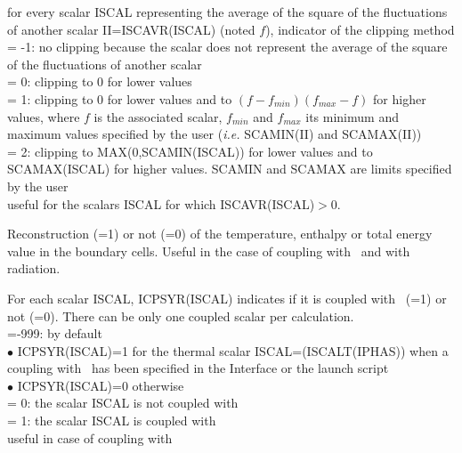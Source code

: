 {for every scalar ISCAL representing the average of the square of the
fluctuations of another scalar II=ISCAVR(ISCAL) (noted $f$),
indicator of the clipping method\\
\hspace*{1.3cm}= -1: no clipping because the scalar does not represent
the average of the square of the fluctuations of another scalar\\
\hspace*{1.3cm}= 0: clipping to 0 for lower values\\
\hspace*{1.3cm}= 1: clipping to 0 for lower values and to
\mbox{$(f-f_{min})(f_{max}-f)$} for higher values, where $f$ is
the associated scalar, $f_{min}$ and $f_{max}$ its minimum and maximum
values specified by the user ({\em i.e.} SCAMIN(II) and SCAMAX(II)) \\
\hspace*{1.3cm}= 2: clipping to MAX(0,SCAMIN(ISCAL)) for lower
values and to SCAMAX(ISCAL) for higher values. SCAMIN and SCAMAX
are limits specified by the user\\
useful for the scalars ISCAL for which ISCAVR(ISCAL)$>$0.}

{Reconstruction (=1) or not (=0) of the temperature, enthalpy or total energy
value in the boundary cells. Useful in the case of coupling with \syrthes\
and with radiation.}

{For each scalar ISCAL, ICPSYR(ISCAL) indicates if it is
coupled with \syrthes\ (=1) or not (=0).
There can be only one coupled scalar per calculation.\\
\hspace*{1.3cm}=-999: by default\\
\hspace*{2.cm} $\bullet$ ICPSYR(ISCAL)=1 for the thermal scalar
ISCAL=(ISCALT(IPHAS)) when a coupling with \syrthes\ has been specified in the
Interface or the launch script\\
\hspace*{2.cm} $\bullet$ ICPSYR(ISCAL)=0 otherwise\\
\hspace*{1.3cm}= 0: the scalar ISCAL is not coupled with \syrthes\\
\hspace*{1.3cm}= 1: the scalar ISCAL is coupled with \syrthes\\
useful in case of coupling with \syrthes}


